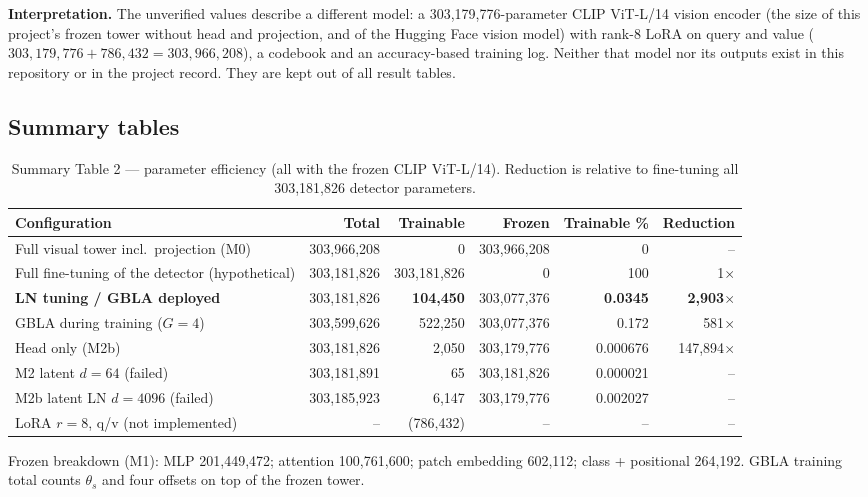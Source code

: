 \documentclass[10pt,a4paper]{article}
\begin{document}
\textbf{Interpretation.} The unverified values describe a different model: a 303,179,776-parameter
CLIP ViT-L/14 vision encoder (the size of this project's frozen tower without head and projection,
and of the Hugging Face vision model) with rank-8 LoRA on query and value
(\(303{,}179{,}776+786{,}432=303{,}966{,}208\)), a codebook and an accuracy-based training log.
Neither that model nor its outputs exist in this repository or in the project record. They are kept
out of all result tables.

\subsection{Summary tables}
\begin{table}[H]\centering\small
\caption{Summary Table 2 --- parameter efficiency (all with the frozen CLIP ViT-L/14). Reduction is relative to fine-tuning all 303,181,826 detector parameters.}\label{tab:params}
\begin{tabularx}{\linewidth}{@{}lRRRRR@{}}
\toprule
Configuration & Total & Trainable & Frozen & Trainable \% & Reduction\\
\midrule
Full visual tower incl.\ projection (M0) & 303,966,208 & 0 & 303,966,208 & 0 & --\\
Full fine-tuning of the detector (hypothetical) & 303,181,826 & 303,181,826 & 0 & 100 & 1\(\times\)\\
\textbf{LN tuning / GBLA deployed} & 303,181,826 & \textbf{104,450} & 303,077,376 & \textbf{0.0345} & \textbf{2,903\(\times\)}\\
GBLA during training (\(G=4\)) & 303,599,626 & 522,250 & 303,077,376 & 0.172 & 581\(\times\)\\
Head only (M2b) & 303,181,826 & 2,050 & 303,179,776 & 0.000676 & 147,894\(\times\)\\
M2 latent \(d=64\) (failed) & 303,181,891 & 65 & 303,181,826 & 0.000021 & --\\
M2b latent LN \(d=4096\) (failed) & 303,185,923 & 6,147 & 303,179,776 & 0.002027 & --\\
LoRA \(r=8\), q/v (not implemented) & -- & (786,432) & -- & -- & --\\
\bottomrule
\end{tabularx}
\par\smallskip\footnotesize Frozen breakdown (M1): MLP 201,449,472; attention 100,761,600; patch embedding 602,112; class + positional 264,192. GBLA training total counts \(\theta_s\) and four offsets on top of the frozen tower.
\end{table}
\end{document}

